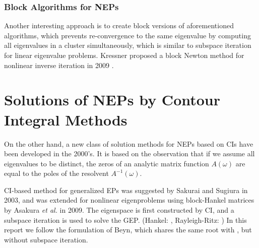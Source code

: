 \documentclass[11pt,letterpaper]{article}
\begin{document}
\subsubsection{Block Algorithms for NEPs}
Another interesting approach is to create block versions of aforementioned algorithms, which prevents re-convergence to the same eigenvalue by computing all eigenvalues in a cluster simultaneously, which is similar to subspace iteration for linear eigenvalue problems. Kressner proposed a block Newton method for nonlinear inverse iteration in 2009 \citep{kressner2009block}. 
\section{Solutions of NEPs by Contour Integral Methods}
On the other hand, a new class of solution methods for NEPs based on CIs have been developed in the 2000's. It is based on the observation that if we assume all eigenvalues to be distinct, the zeros of an analytic matrix function $A(\omega)$ are equal to the poles of the resolvent $A^{-1}(\omega)$. 

CI-based method for generalized EPs was suggested by Sakurai and Sugiura in 2003, \citep{sakurai2003projection} and was extended for nonlinear eigenproblems using block-Hankel matrices by Asakura {\it et al.} in 2009. \citep{asakura_numerical_2009} The eigenspace is first constructed by CI, and a subspace iteration is used to solve the GEP. (Hankel: \citep{asakura_numerical_2009}, Rayleigh-Ritz: \citep{yokota_projection_2013}) In this report we follow the formulation of Beyn\citep{beyn_integral_2012}, which shares the same root with \citep{asakura_numerical_2009, sakurai_efficient_2013}, but without subspace iteration. 

\end{document}
